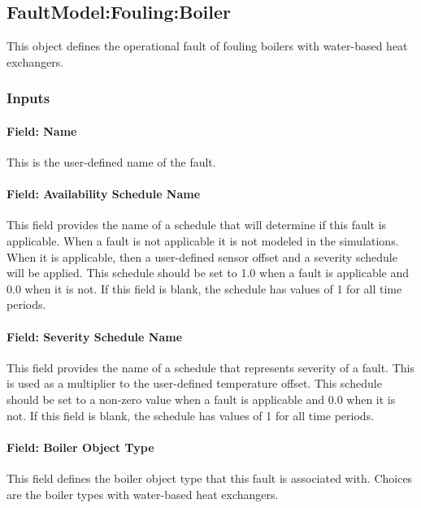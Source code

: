 \subsection{FaultModel:Fouling:Boiler}\label{faultmodelfoulingboiler}

This object defines the operational fault of fouling boilers with water-based heat exchangers.

\subsubsection{Inputs}

\paragraph{Field: Name}

This is the user-defined name of the fault.

\paragraph{Field: Availability Schedule Name}

This field provides the name of a schedule that will determine if this fault is applicable. When a fault is not applicable it is not modeled in the simulations. When it is applicable, then a user-defined sensor offset and a severity schedule will be applied. This schedule should be set to 1.0 when a fault is applicable and 0.0 when it is not. If this field is blank, the schedule has values of 1 for all time periods.

\paragraph{Field: Severity Schedule Name}\label{field-severity-schedule-name}

This field provides the name of a schedule that represents severity of a fault. This is used as a multiplier to the user-defined temperature offset. This schedule should be set to a non-zero value when a fault is applicable and 0.0 when it is not. If this field is blank, the schedule has values of 1 for all time periods.

\paragraph{Field: Boiler Object Type}\label{field-boiler-object-type}

This field defines the boiler object type that this fault is associated with. Choices are the boiler types with water-based heat exchangers. 

